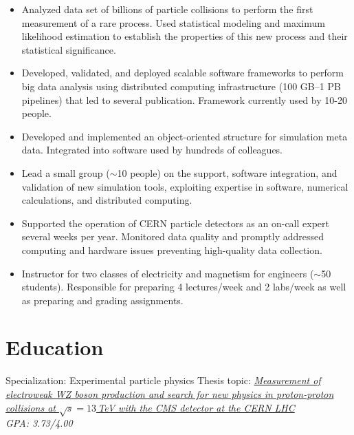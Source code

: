 \documentclass[9pt,a4paper]{moderncv}
\begin{document}
{
\begin{itemize}
    \item Analyzed data set of billions of particle collisions to perform the first measurement of a rare process. Used statistical modeling and maximum likelihood estimation to establish the properties of this new process and their statistical significance.
    \item Developed, validated, and deployed scalable software frameworks to perform big data analysis using
distributed computing infrastructure (100 GB--1 PB pipelines) that led to several publication. Framework currently used by 10-20 people.
    \item Developed and implemented an object-oriented structure for simulation meta data. Integrated into software used by hundreds of colleagues. 
    \item Lead a small group ($\sim$10 people) on the support, software integration, and validation of new simulation tools, exploiting expertise in software, numerical calculations, and distributed computing.
    \item Supported the operation of CERN particle detectors as an on-call expert several weeks per year. Monitored data quality and promptly addressed computing and hardware issues preventing high-quality data collection.
    \item Instructor for two classes of electricity and magnetism for engineers ($\sim$50 students). Responsible for preparing 4 lectures/week and 2 labs/week as well as preparing and grading assignments.
\end{itemize}
}
\newpage
\section{Education}
{
    Specialization: Experimental particle physics\newline 
    Thesis topic:  \href{http://cds.cern.ch/record/2673625?ln=en}{\emph{Measurement of electroweak WZ boson production and search for new physics in proton-proton collisions at $\sqrt{s}=13$\,TeV with the CMS detector at the CERN LHC}} \\
    \normalsize \textit{GPA: 3.73/4.00} 
}
\end{document}
